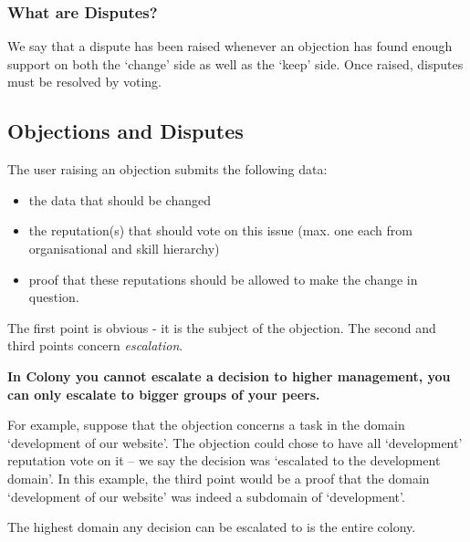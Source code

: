 \subsubsection*{What are Disputes?}
We say that a dispute has been raised whenever an objection has found enough support on both the `change' side as well as the `keep' side. Once raised, disputes must be resolved by voting. 

\subsection{Objections and Disputes}\label{sec:objections-and-disputes}

The user raising an objection submits the following data:
\begin{itemize}
 \item the data that should be changed
 \item the reputation(s) that should vote on this issue (max. one each from organisational and skill hierarchy)
 \item proof that these reputations should be allowed to make the change in question. 
\end{itemize}

The first point is obvious - it is the subject of the objection. The second and third points concern \emph{escalation}. 

\begin{center}
 \textbf{In Colony you cannot escalate a decision to higher management, you can only escalate to bigger groups of your peers.}
\end{center}

For example, suppose that the objection concerns a task in the domain `development of our website'. The objection could chose to have all `development' reputation vote on it -- we say the decision was `escalated to the development domain'. In this example, the third point would be a proof that the domain `development of our website' was indeed a subdomain of `development'.

The highest domain any decision can be escalated to is the entire colony.

% 

